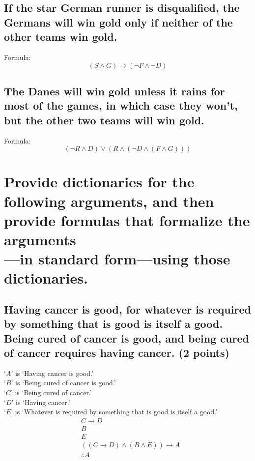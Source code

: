 \documentclass[10pt, letterpaper, titlepage]{article}
\begin{document}
        \subsection{If the star German runner is disqualified, the Germans will win gold only if neither
            of the other teams win gold.}
            Formula:
            \[
                (S \land G) \to (\lnot F \land \lnot D)
            \]

        \subsection{ The Danes will win gold unless it rains for most of the games, in which case they
            won’t, but the other two teams will win gold.}
            Formula:
            \[
                (\lnot R \land D) \lor (R \land ( \lnot D \land (F \land G)))
            \]

    \newpage    
    \section{Provide dictionaries for the following arguments, and then provide formulas that formalize
         the arguments\\
         —in standard form—using those dictionaries.}
        \subsection{Having cancer is good, for whatever is required by something that is good is itself
            a good. Being cured of cancer is good, and being cured of cancer requires having
            cancer. (2 points)}
            `$A$' is `Having cancer is good.'\\
            `$B$' is `Being cured of cancer is good.'\\
            `$C$' is `Being cured of cancer.'\\
            `$D$' is `Having cancer.'\\
            `$E$' is `Whatever is required by something that is good is itself a good.'
            \begin{align*}
                &C \to D \\
                &B \\
                &E \\
                &((C \to D) \land (B \land E)) \to A \\
                &\therefore A
            \end{align*}
\end{document}
